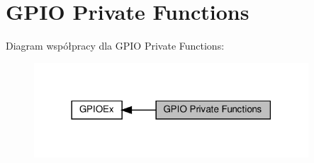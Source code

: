 \hypertarget{group___g_p_i_o_ex___private___functions}{}\section{G\+P\+IO Private Functions}
\label{group___g_p_i_o_ex___private___functions}
Diagram współpracy dla G\+P\+IO Private Functions\+:\nopagebreak
\begin{figure}[H]
\begin{center}
\leavevmode
\includegraphics[width=290pt]{group___g_p_i_o_ex___private___functions}
\end{center}
\end{figure}
